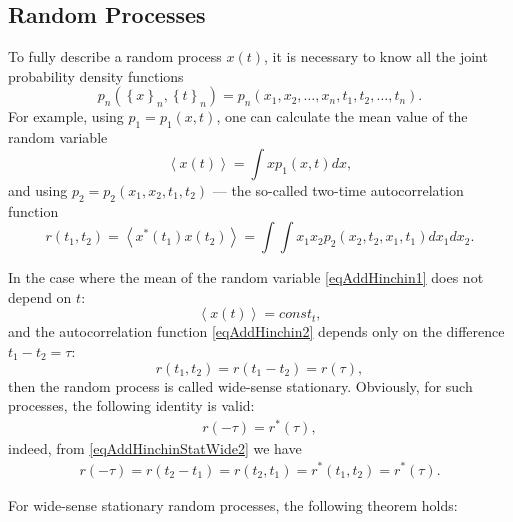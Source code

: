 \subsection{Random Processes}
To fully describe a random process $x\left(t\right)$,
it is necessary to know all the joint probability density functions
\[
p_n\left(\left\{x\right\}_n,\left\{t\right\}_n\right) = 
p_n\left(x_1,x_2,\dots,x_n,t_1,t_2,\dots,t_n\right).
\] 
For example, using $p_1 = p_1\left(x,t\right)$, one can calculate the mean 
value of the random variable
\begin{equation}
\left<x\left(t\right)\right> = \int x p_1\left(x,t\right) dx,
\label{eqAddHinchin1}
\end{equation}
and using $p_2 = p_2\left(x_1,x_2,t_1,t_2\right)$ — the so-called
two-time autocorrelation function  
\begin{equation}
r\left(t_1, t_2\right) = \left<x^{*}\left(t_1\right) x\left(t_2\right)\right> = \int
\int x_1 x_2 p_2\left(x_2,t_2,x_1,t_1\right)dx_1 dx_2.
\label{eqAddHinchin2}
\end{equation}

In the case where the mean of the random variable \eqref{eqAddHinchin1} does not
depend on $t$:
\begin{equation}
\left<x\left(t\right)\right> = const_t,
\label{eqAddHinchinStatWide1}
\end{equation}
and the autocorrelation function \eqref{eqAddHinchin2} depends only on
the difference $t_1 - t_2 = \tau$:
\begin{equation}
r\left(t_1, t_2\right) = r\left(t_1 - t_2\right) = r\left(\tau\right),
\label{eqAddHinchinStatWide2}
\end{equation}
then the random process is called wide-sense stationary. Obviously, for such processes, the following
identity is valid:
\begin{eqnarray}
r\left(- \tau\right) = r^{*}\left(\tau\right),
\label{eqAddHinchinStatWide3}
\end{eqnarray}
indeed, from \eqref{eqAddHinchinStatWide2} we have
\begin{eqnarray}
r\left(- \tau\right) = r\left(t_2 - t_1\right) = r\left(t_2,
t_1\right) = r^{*}\left(t_1, t_2\right) = r^{*}\left(\tau\right).
\nonumber
\end{eqnarray}


For wide-sense stationary random processes, the following theorem holds:

